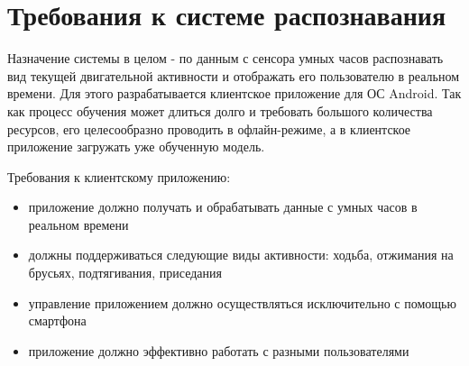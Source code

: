 
\section{Требования к системе распознавания}

Назначение системы в целом - по данным с сенсора умных часов распознавать вид текущей двигательной активности и отображать его пользователю в реальном времени. Для этого разрабатывается клиентское приложение для ОС Android. Так как процесс обучения может длиться долго и требовать большого количества ресурсов, его целесообразно проводить в офлайн-режиме, а в клиентское приложение загружать уже обученную модель.

Требования к клиентскому приложению:

\begin{itemize}
\item приложение должно получать и обрабатывать данные с умных часов в реальном времени
\item должны поддерживаться следующие виды активности: ходьба, отжимания на брусьях, подтягивания, приседания
\item управление приложением должно осуществляться исключительно с помощью смартфона
\item приложение должно эффективно работать с разными пользователями
\end{itemize}
